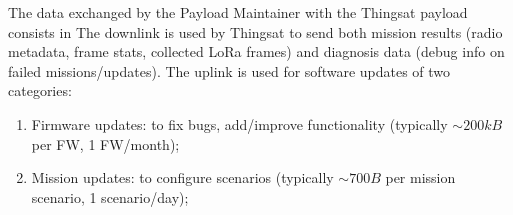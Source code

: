 The data exchanged by the Payload Maintainer with the Thingsat payload consists in 
The downlink is used by Thingsat to send both mission results (radio metadata, frame stats, collected LoRa frames) and diagnosis data (debug info on failed missions/updates).
The uplink is used for software updates of two categories:
\begin{enumerate}
    \item Firmware updates: to fix bugs, add/improve functionality (typically $\sim 200kB$ per FW, 1 FW/month);
    \item Mission updates: to configure scenarios (typically $\sim 700B$ per mission scenario, 1 scenario/day);
\end{enumerate} 









